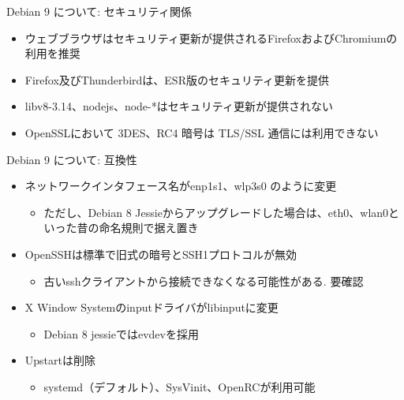 \documentclass[cjk,c,squeeze,shrink,dvipdfmx,12pt]{beamer}
\begin{document}
\begin{frame}[fragile]{Debian 9 について: セキュリティ関係}%

\begin{itemize}
\item ウェブブラウザはセキュリティ更新が提供されるFirefoxおよびChromiumの利用を推奨
\item Firefox及びThunderbirdは、ESR版のセキュリティ更新を提供
\item libv8-3.14、nodejs、node-*はセキュリティ更新が提供されない
\item OpenSSLにおいて 3DES、RC4 暗号は TLS/SSL 通信には利用できない
\end{itemize}

\end{frame}


\begin{frame}[fragile]{Debian 9 について: 互換性}%

\begin{itemize}
\item ネットワークインタフェース名がenp1s1、wlp3s0 のように変更
  \begin{itemize}
  \item ただし、Debian 8 Jessieからアップグレードした場合は、eth0、wlan0といった昔の命名規則で据え置き
  \end{itemize}
\item OpenSSHは標準で旧式の暗号とSSH1プロトコルが無効
  \begin{itemize}
  \item 古いsshクライアントから接続できなくなる可能性がある. 要確認
  \end{itemize}
\item X Window Systemのinputドライバがlibinputに変更
  \begin{itemize}
  \item Debian 8 jessieではevdevを採用
  \end{itemize}
\item Upstartは削除
  \begin{itemize}
  \item systemd（デフォルト）、SysVinit、OpenRCが利用可能
  \end{itemize}
\end{itemize}

\end{frame}
\end{document}

